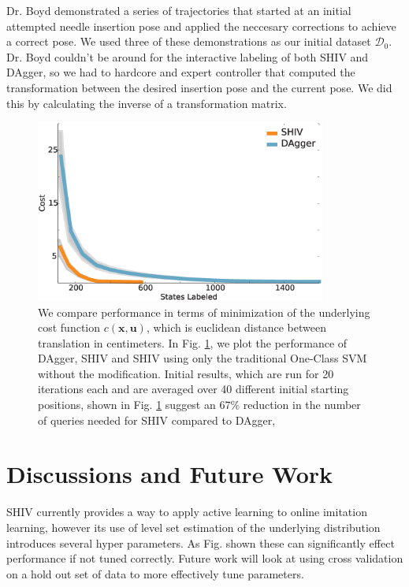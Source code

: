 \documentclass[10pt, conference]{ieeeconf}      %
\newcommand{\bu}{\mathbf{u}}
\newcommand{\bx}{\mathbf{x}}
\begin{document}
Dr. Boyd demonstrated a series of trajectories that started at an initial attempted needle insertion pose and applied the neccesary corrections to achieve a correct pose. We used three of these demonstrations as our initial dataset $\mathcal{D}_0$. Dr. Boyd couldn't be around for the interactive labeling of both SHIV and DAgger, so we had to hardcore and expert controller that computed the transformation between the desired insertion pose and the current pose. We did this by calculating the inverse of a transformation matrix. 

\begin{figure}[t!]
\centering
\includegraphics[width=\columnwidth, height=6cm]{figures/needle_insertion_results.eps}
\caption{We compare performance in terms of minimization of the underlying cost function $c(\bx,\bu)$, which is euclidean distance between translation in centimeters. In Fig. \ref{fig:car_cost}, we plot the performance of DAgger, SHIV and SHIV using only the traditional One-Class SVM without the modification.  Initial results, which are run for 20 iterations each and are averaged over 40 different initial starting positions, shown in Fig. \ref{fig:car_cost} suggest an $67\%$ reduction in the number of queries needed for SHIV compared to DAgger,}
\vspace*{-10pt}
\label{fig:car_cost}
\end{figure}



\section{Discussions and Future Work}
SHIV currently provides a way to apply active learning to online imitation learning, however its use of level set estimation of the underlying distribution introduces several hyper parameters. As Fig. shown these can significantly effect performance if not tuned correctly. Future work will look at using cross validation on a hold out set of data to more effectively tune parameters. 
\end{document}
